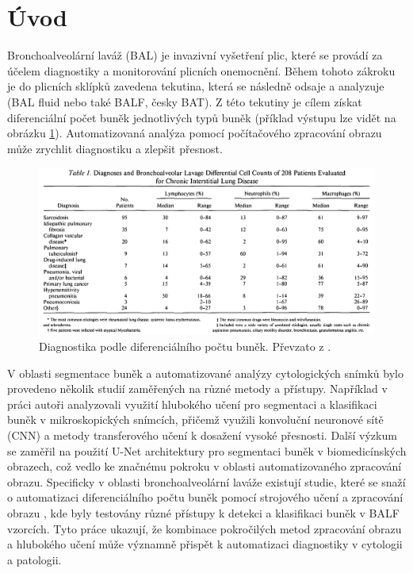 \chapter*{Úvod}
\renewcommand{\chaptername}{Úvod}

Bronchoalveolární laváž (BAL) je invazivní vyšetření plic, které se provádí za účelem diagnostiky a monitorování plicních onemocnění.
Během tohoto zákroku je do plicních sklípků zavedena tekutina, která se následně odsaje a analyzuje (BAL fluid nebo také BALF, česky BAT).
Z této tekutiny je cílem získat diferenciální počet buněk jednotlivých typů buněk (příklad výstupu lze vidět na obrázku \ref{fig:tabulka_dif_pocty}).
Automatizovaná analýza pomocí počítačového zpracování obrazu může zrychlit diagnostiku a zlepšit přesnost.

\begin{figure}[H]
    \centering
    \includegraphics[width=\textwidth]{static/obrazky/tabulka_dif_pocty.png}
    \caption{Diagnostika podle diferenciálního počtu buněk. Převzato z \cite{Check19851201}.}
    \label{fig:tabulka_dif_pocty}
\end{figure}

V oblasti segmentace buněk a automatizované analýzy cytologických snímků bylo provedeno několik studií zaměřených na různé metody a přístupy. Například v práci \cite{Caicedo2019} autoři analyzovali využití hlubokého učení pro segmentaci a klasifikaci buněk v mikroskopických snímcích, přičemž využili konvoluční neuronové sítě (CNN) a metody transferového učení k dosažení vysoké přesnosti. Další výzkum \cite{Ronneberger2015} se zaměřil na použití U-Net architektury pro segmentaci buněk v biomedicínských obrazech, což vedlo ke značnému pokroku v oblasti automatizovaného zpracování obrazu. Specificky v oblasti bronchoalveolární laváže existují studie, které se snaží o automatizaci diferenciálního počtu buněk pomocí strojového učení a zpracování obrazu \cite{Smith2021}, kde byly testovány různé přístupy k detekci a klasifikaci buněk v BALF vzorcích. Tyto práce ukazují, že kombinace pokročilých metod zpracování obrazu a hlubokého učení může významně přispět k automatizaci diagnostiky v cytologii a patologii.



